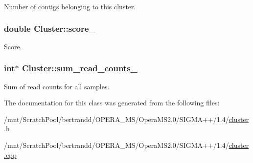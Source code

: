\label{classCluster_a61cd37076cceb450e29110bd7f9aec06}
Number of contigs belonging to this cluster. \hypertarget{classCluster_a2de8478f1b4c40b426c8723b38d4d942}{
\subsubsection[{score\_\-}]{\setlength{\rightskip}{0pt plus 5cm}double {\bf Cluster::score\_\-}}}
\label{classCluster_a2de8478f1b4c40b426c8723b38d4d942}
Score. \hypertarget{classCluster_a8769dcdea90ef8b097af10ba2ed506ad}{
\subsubsection[{sum\_\-read\_\-counts\_\-}]{\setlength{\rightskip}{0pt plus 5cm}int$\ast$ {\bf Cluster::sum\_\-read\_\-counts\_\-}}}
\label{classCluster_a8769dcdea90ef8b097af10ba2ed506ad}
Sum of read counts for all samples. 

The documentation for this class was generated from the following files:\begin{DoxyCompactItemize}
\item 
/mnt/ScratchPool/bertrandd/OPERA\_\-MS/OperaMS2.0/SIGMA++/1.4/\hyperlink{cluster_8h}{cluster.h}\item 
/mnt/ScratchPool/bertrandd/OPERA\_\-MS/OperaMS2.0/SIGMA++/1.4/\hyperlink{cluster_8cpp}{cluster.cpp}\end{DoxyCompactItemize}
